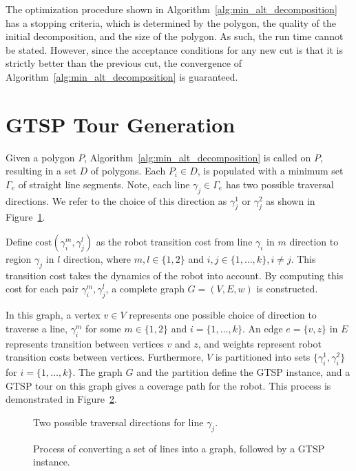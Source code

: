 \documentclass[../main.tex]{subfiles}
\begin{document}
The optimization procedure shown in Algorithm~\ref{alg:min_alt_decomposition} has a stopping criteria, which is determined by the polygon, the quality of the initial decomposition, and the size of the polygon. As such, the run time cannot be stated. However, since the acceptance conditions for any new cut is that it is strictly better than the previous cut, the convergence of Algorithm~\ref{alg:min_alt_decomposition} is guaranteed.


\section{GTSP Tour Generation}
\label{section:single_agent_gtsp_tour}

Given a polygon $P$, Algorithm~\ref{alg:min_alt_decomposition} is called on $P$, resulting in a set $D$ of polygons. Each $P_i\in D$, is populated with a minimum set $\Gamma_e$ of straight line segments. Note, each line $\gamma_j\in\Gamma_e$ has two possible traversal directions. We refer to the choice of this direction as $\gamma_j^1$ or $\gamma_j^2$  as shown in Figure~\ref{fig:traversal_directions}.

Define $\text{cost}(\gamma_i^m, \gamma_j^l)$ as the robot transition cost from line $\gamma_i$ in $m$ direction to region $\gamma_j$ in $l$ direction, where $m,l\in\{1,2\}$ and $i,j\in\{1,\ldots,k\},i\neq j$. This transition cost takes the dynamics of the robot into account. By computing this cost for each pair $\gamma_i^m, \gamma_j^l$, a complete graph $G=(V,E,w)$ is constructed.

In this graph, a vertex $v\in V$ represents one possible choice of direction to traverse a line, $\gamma^m_i$ for some $m\in\{1,2\}$ and $i=\{1,\ldots,k\}$. An edge $e=\{v,z\}$ in $E$ represents transition between vertices $v$ and $z$, and weights represent robot transition costs between vertices. Furthermore, $V$ is partitioned into sets $\{\gamma_i^1,\gamma_i^2\}$ for $i=\{1,\ldots,k\}$. The graph $G$ and the partition define the GTSP instance, and a GTSP tour on this graph gives a coverage path for the robot. This process is demonstrated in Figure~\ref{fig:line_to_gtsp}. 

\begin{figure}
	\centering
	
	\caption{Two possible traversal directions for line $\gamma_j$.}
	\label{fig:traversal_directions}
\end{figure}
\begin{figure}
	\centering
	
	\caption{Process of converting a set of lines into a graph, followed by a GTSP instance.}
	\label{fig:line_to_gtsp}
\end{figure}
\end{document}
